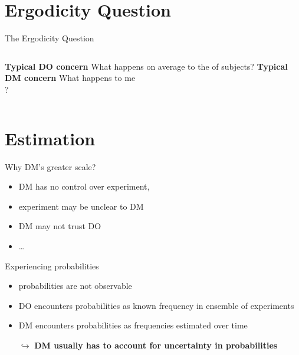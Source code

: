 \section{Ergodicity Question}

\begin{frame}{The Ergodicity Question}
\begin{columns}[T]
	\bc \textbf{Typical DO concern} \ec
	What happens on average to the  of subjects?
\centering \vspace{4em}  \red{\large $\neq$}
	\bc \textbf{Typical DM concern} \ec
	What happens to me \\
	?
\end{columns}
\end{frame}


\section{Estimation}
\begin{frame}{Why DM's greater scale?}

\begin{itemize}
  \item DM has no control over experiment,
  \item experiment may be unclear to DM
  \item DM may not trust DO
  \item \ldots
\end{itemize}
\end{frame}

\begin{frame}{Experiencing probabilities}

\begin{itemize}
  \item probabilities are not observable
  \item DO encounters probabilities as known frequency in ensemble of experiments
  \item DM encounters probabilities as frequencies estimated over time

  \item[$\hookrightarrow$] \textbf{DM usually has to account for uncertainty in probabilities}
\end{itemize}
\end{frame}


